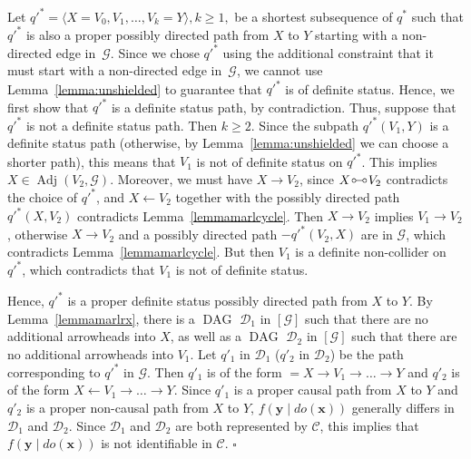 \documentclass[11pt,a4paper]{article}
\newenvironment{proofof}[1][]{\begin{trivlist}
   \item[\hskip \labelsep {\bfseries Proof of #1.}]}{\hfill{}$\square$\end{trivlist}}
\DeclareMathOperator{\DAG}{DAG}
\DeclareMathOperator{\Adj}{Adj}
\newcommand{\g}[1][G]{\mathcal{#1}}
\newcommand{\pstar}[1][p]{{#1}^{*}}
\newcommand{\circcirc}{
  \setlength{\unitlength}{1mm}
  \begin{picture}(5,1)(0,0)
    \put(1,1){\circle{1}}
    \put(1.5,1){\line(1,0){2}}
    \put(4,1){\circle{1}}
  \end{picture}
}
\begin{document}
\begin{proofof}[Lemma~\ref{lemma:adj amen gen}]
   Let $\pstar[q'] = \langle X= V_0,V_1,\dots,V_k=Y\rangle, k \ge 1,$ be a shortest subsequence of $\pstar[q]$ such that $\pstar[q']$ is also a proper possibly directed path from $X$ to $Y$ starting with a non-directed edge in~$\g$. Since we chose $\pstar[q']$ using the additional constraint that it must start with a non-directed edge in~$\g$, we cannot use Lemma~\ref{lemma:unshielded} to guarantee that $\pstar[q']$ is of definite status. Hence, we first show that $\pstar[q']$ is a definite status path, by contradiction. Thus, suppose that $\pstar[q']$ is not a definite status path. Then $k \ge 2$. Since the subpath $\pstar[q'](V_1,Y)$ is a definite status path (otherwise, by Lemma~\ref{lemma:unshielded} we can choose a shorter path), this means that $V_1$ is not of definite status on $\pstar[q']$. This implies $X \in \Adj(V_2,\g)$. Moreover, we must have $X \to V_2$, since $X \circcirc V_2$ contradicts the choice of $\pstar[q']$, and $X \leftarrow V_2$ together with the possibly directed path $\pstar[q'](X,V_2)$ contradicts Lemma~\ref{lemmamarlcycle}. Then $X \to V_2$ implies  $V_1 \to V_2$, otherwise $X \rightarrow V_2$ and a possibly directed path $- \pstar[q'](V_2,X)$ are in $\g$, which contradicts Lemma~\ref{lemmamarlcycle}. But then $V_1$ is a definite non-collider on $\pstar[q']$, which contradicts that $V_1$ is not of definite status.

   Hence, $\pstar[q']$ is a proper definite status possibly directed path from $X$ to $Y$. By Lemma~\ref{lemmamarlrx}, there is a $\DAG$ $\g[D]_1$ in $[\g]$ such that there are no additional arrowheads into $X$, as well as a $\DAG$ $\g[D]_2$ in $[\g]$ such that there are no additional arrowheads into $V_1$. Let $q'_1$ in $\g[D]_1$ ($q'_2$ in $\g[D]_2$) be the path corresponding to $\pstar[q']$ in $\g$. Then $q'_1$ is of the form $= X \to V_1 \to \dots \to Y$ and $q'_2 $ is of the form $X \leftarrow V_1 \to \dots \to Y$. Since $q'_1$ is a proper causal path from $X$ to $Y$ and $q'_2$ is a proper non-causal path from $X$ to $Y$, $f(\mathbf{y}\mid do(\mathbf{x}))$ generally differs in $\g[D]_1$ and $\g[D]_2$. Since $\g[D]_1$ and $\g[D]_2$ are both represented by $\g[C]$, this implies that $f(\mathbf{y}\mid do(\mathbf{x}))$ is not identifiable in $\g[C]$.
\end{proofof}
\end{document}
